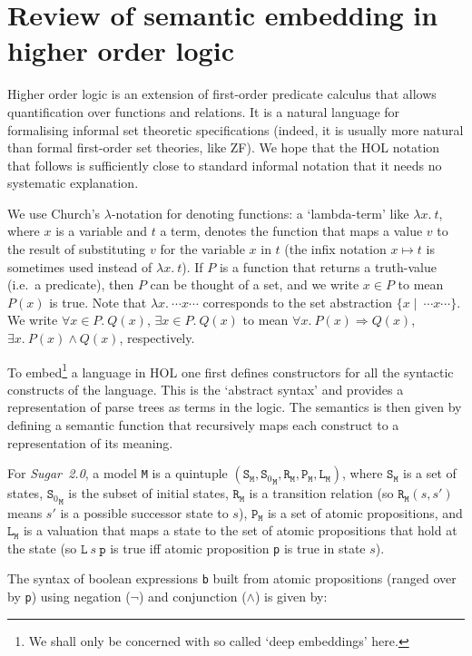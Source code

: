 \documentclass{llncs}
\newcommand\Sugar{{\it{Sugar~2.0}}\xspace}
\newcommand\Hol{HOL\xspace}
\renewcommand{\t}[1]{\texttt{#1}}
\renewcommand{\L}{\texttt{L}\xspace}
\begin{document}
\section{Review of semantic embedding in higher order logic}\label{review}

Higher order logic is an extension of first-order predicate calculus
that allows quantification over functions and relations. It is a
natural language for formalising informal set theoretic specifications
(indeed, it is usually more natural than formal first-order set
theories, like ZF).  We hope that the \Hol notation that follows is
sufficiently close to standard informal notation that it needs no
systematic explanation.

We use Church's $\lambda$-notation for denoting functions: a
`lambda-term' like $\lambda x.~t$, where $x$ is a variable and $t$ a
term, denotes the function that maps a value $v$ to the result of
substituting $v$ for the variable $x$ in $t$ (the infix notation $x
\mapsto t$ is sometimes used instead of $\lambda x.~t$). If $P$ is a
function that returns a truth-value (i.e.~a predicate), then $P$ can
be thought of a set, and we write $x \in P$ to mean $P(x)$ is
true. Note that $\lambda x .~\cdots{x}\cdots$ corresponds to the set abstraction
$\{x \mid ~\cdots{x}\cdots\}$. We write $\forall x\in P.~Q(x)$, $\exists x\in
P.~Q(x)$ to mean $\forall x.~P(x)\Rightarrow Q(x)$, $\exists
x.~P(x)\wedge Q(x)$, respectively.

To embed\footnote{We shall only be concerned with so called `deep
embeddings' here.}  a language in \Hol one first defines constructors
for all the syntactic constructs of the language. This is the
`abstract syntax' and provides a representation of parse trees as
terms in the logic.  The semantics is then given by defining a
semantic function that recursively maps each construct to a
representation of its meaning.

For \Sugar, a model \t{M} is a quintuple
$(\t{S}_{\t{M}},{\t{S}_0}_{\t{M}},\t{R}_{\t{M}},\t{P}_{\t{M}},\t{L}_{\t{M}})$, where $\t{S}_{\t{M}}$
is a set of states, ${\t{S}_0}_{\t{M}}$ is the subset of initial states, $\t{R}_{\t{M}}$ is a
transition relation (so $\t{R}_{\t{M}}(s,s')$ means $s'$ is a possible
successor state to $s$), $\t{P}_{\t{M}}$ is a set of atomic propositions, and
$\L_{\t{M}}$ is a valuation that maps a state to the
set of atomic propositions that hold at the state
(so $\L~s~\t{p}$ is true iff atomic proposition
\t{p} is true in state $s$).

The syntax of boolean expressions \t{b}
built from atomic propositions
(ranged over by \t{p}) using negation ($\neg$) and conjunction ($\wedge$)
is given by:
\end{document}
